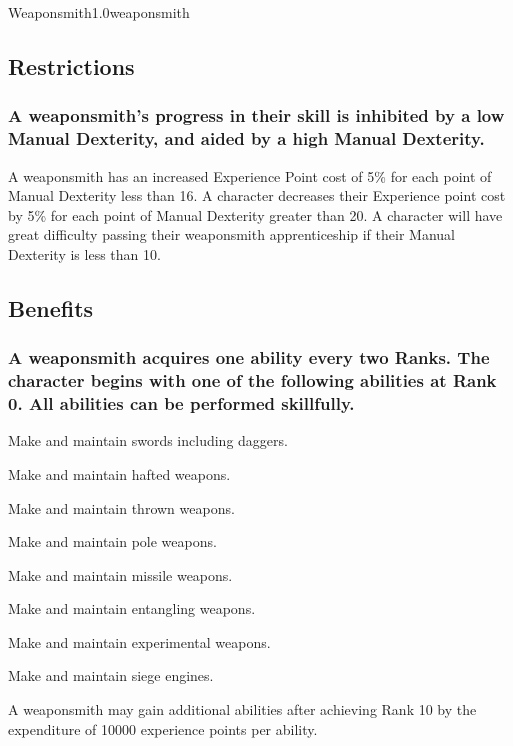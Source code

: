 \begin{skill}{Weaponsmith}{1.0}{weaponsmith}

\subsection{Restrictions}

\subsubsection{A weaponsmith's progress in their skill is inhibited by a
low Manual Dexterity, and aided by a high Manual Dexterity.}

A weaponsmith has an increased Experience Point cost of 5\% for each
point of Manual Dexterity less than 16.  A character decreases their
Experience point cost by 5\% for each point of Manual Dexterity
greater than 20.  A character will have great difficulty passing their
weaponsmith apprenticeship if their Manual Dexterity is less than 10.

\subsection{Benefits}

\subsubsection{A weaponsmith acquires one ability every two Ranks.  The
character begins with one of the following abilities at Rank 0.  All
abilities can be performed skillfully.}

{\raggedright \begin{Enumerate}
\item Make and maintain swords including daggers.
\item Make and maintain hafted weapons.
\item Make and maintain thrown weapons.
\item Make and maintain pole weapons.
\item Make and maintain missile weapons.
\item Make and maintain entangling weapons.
\item Make and maintain experimental weapons.
\item Make and maintain siege engines.
\end{Enumerate}}

A weaponsmith may gain additional abilities after achieving Rank 10 by
the expenditure of 10000 experience points per ability.


\end{skill}
